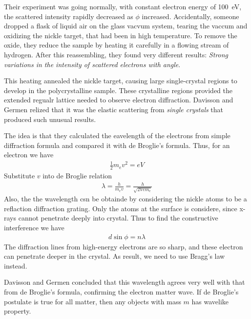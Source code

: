         \bulletpar Their experiment was going normally, with constant electron energy of \SI{100}{eV}, the scattered intensity rapidly decreased as $\phi$ increased.
        Accidentally, someone dropped a flask of liquid air on the glass vacvum system, tearing the vaccum and oxidizing the nickle target, that had been in high
        temperature. To remove the oxide, they reduce the sample by heating it carefully in a flowing stream of hydrogen. After this reassembling, they found very
        different results: \textit{Strong variations in the intensity of scattered electrons with angle}.

        \bulletpar This heating annealed the nickle target, causing large single-crystal regions to develop in the polycrystalline sample. These crystalline regions 
        provided the extended regualr lattice needed to observe electron diffraction. Davisson and Germen relized that it was the elastic scattering from \textit{single
        crystals} that produced such unusual results. 

        \bulletpar The idea is that they calculated the eavelength of the electrons from simple diffraction formula and compared it with de Broglie's formula.
        Thus, for an electron we have 
        \begin{align*}
            \frac{1}{2}m_e v^2 = eV
        \end{align*}
        Substitute $v$ into de Broglie relation
        \begin{align*}
            \lambda = \frac{h}{m_e v} = \frac{h}{\sqrt{2Vem_e}}
        \end{align*}
        Also, the the wavelength csn be obtainde by considering the nickle atoms to be a reflaction diffraction grating. Only the atoms at the surface is considere, since
        x-rays cannot penetrate deeply into crystal. Thus to find the constructive interference we have 
        \begin{align}
            d \sin{\phi} = n \lambda
        \end{align}
        The diffraction lines from high-energy electrons are so sharp, and these electron can penetrate deeper in the crystal. As result, we need to use Bragg's law instead.

        \bulletpar Davisson and Germen concluded that this wavelength agrees very well with that from de Broglie's formula, confirming the electron matter wave. If de Broglie's 
        postulate is true for all matter, then any objects with mass $m$ has wavelike property.


